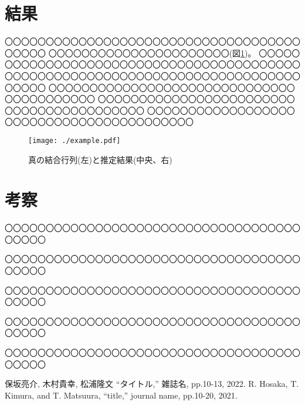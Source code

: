 \documentclass[dvipdfmx, A4j, twocolumn, 10.5pt]{jsarticle}
\begin{document}
\section{結果}
〇〇〇〇〇〇〇〇〇〇〇〇〇〇〇〇〇〇〇〇〇〇〇〇〇〇〇〇〇〇〇〇〇〇〇〇〇〇〇〇〇
〇〇〇〇〇〇〇〇〇〇〇〇〇〇〇〇〇〇〇〇〇〇(図\ref{fig:matrix})。
〇〇〇〇〇〇〇〇〇〇〇〇〇〇〇〇〇〇〇〇〇〇〇〇〇〇〇〇〇〇〇〇〇〇〇〇〇〇〇〇〇
〇〇〇〇〇〇〇〇〇〇〇〇〇〇〇〇〇〇〇〇〇〇〇〇〇〇〇〇〇〇〇〇〇〇〇〇〇〇〇〇〇
〇〇〇〇〇〇〇〇〇〇〇〇〇〇〇〇〇〇〇〇〇〇〇〇〇〇〇〇〇〇〇〇〇〇〇〇〇〇〇〇〇
〇〇〇〇〇〇〇〇〇〇〇〇〇〇〇〇〇〇〇〇〇〇〇〇〇〇〇〇〇〇〇〇〇〇〇〇〇〇〇〇〇
〇〇〇〇〇〇〇〇〇〇〇〇〇〇〇〇〇〇〇〇〇〇〇〇〇〇〇〇〇〇〇〇〇〇〇〇〇〇〇〇〇

\begin{figure}[htbp] %
\texttt{[image: ./example.pdf]}
\caption{真の結合行列(左)と推定結果(中央、右)} \label{fig:matrix}
\end{figure}


\section{考察}
〇〇〇〇〇〇〇〇〇〇〇〇〇〇〇〇〇〇〇〇〇〇〇〇〇〇〇〇〇〇〇〇〇〇〇〇〇〇〇〇〇

〇〇〇〇〇〇〇〇〇〇〇〇〇〇〇〇〇〇〇〇〇〇〇〇〇〇〇〇〇〇〇〇〇〇〇〇〇〇〇〇〇

〇〇〇〇〇〇〇〇〇〇〇〇〇〇〇〇〇〇〇〇〇〇〇〇〇〇〇〇〇〇〇〇〇〇〇〇〇〇〇〇〇

〇〇〇〇〇〇〇〇〇〇〇〇〇〇〇〇〇〇〇〇〇〇〇〇〇〇〇〇〇〇〇〇〇〇〇〇〇〇〇〇〇

〇〇〇〇〇〇〇〇〇〇〇〇〇〇〇〇〇〇〇〇〇〇〇〇〇〇〇〇〇〇〇〇〇〇〇〇〇〇〇〇〇



\begin{thebibliography}{99}
 保坂亮介, 木村貴幸, 松浦隆文 ``タイトル,'' 雑誌名, pp.10-13, 2022.
 R. Hosaka, T. Kimura, and T. Matsuura, ``title,'' journal name, pp.10-20, 2021.
\end{thebibliography}

\fi
\end{document}
